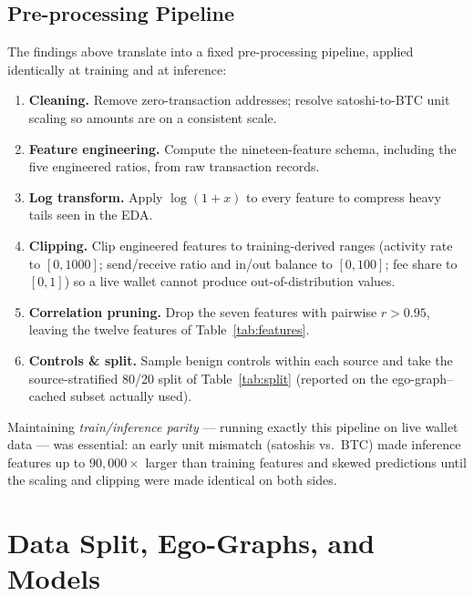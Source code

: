 \documentclass[12pt,a4paper,openany]{report}
\begin{document}
\section{Pre-processing Pipeline}
The findings above translate into a fixed pre-processing pipeline, applied identically at
training and at inference:
\begin{enumerate}[leftmargin=1.4em,itemsep=2pt]
  \item \textbf{Cleaning.} Remove zero-transaction addresses; resolve satoshi-to-BTC unit
    scaling so amounts are on a consistent scale.
  \item \textbf{Feature engineering.} Compute the nineteen-feature schema, including the five
    engineered ratios, from raw transaction records.
  \item \textbf{Log transform.} Apply $\log(1+x)$ to every feature to compress heavy tails
    seen in the EDA.
  \item \textbf{Clipping.} Clip engineered features to training-derived ranges (activity rate
    to $[0,1000]$; send/receive ratio and in/out balance to $[0,100]$; fee share to $[0,1]$) so
    a live wallet cannot produce out-of-distribution values.
  \item \textbf{Correlation pruning.} Drop the seven features with pairwise $r>0.95$, leaving
    the twelve features of Table~\ref{tab:features}.
  \item \textbf{Controls \& split.} Sample benign controls within each source and take the
    source-stratified 80/20 split of Table~\ref{tab:split} (reported on the ego-graph--cached
    subset actually used).
\end{enumerate}
Maintaining \emph{train/inference parity} --- running exactly this pipeline on live wallet data ---
was essential: an early unit mismatch (satoshis vs.\ BTC) made inference features up to
$90{,}000\times$ larger than training features and skewed predictions until the scaling and
clipping were made identical on both sides.

\chapter{Data Split, Ego-Graphs, and Models}\label{ch:models}
\end{document}
